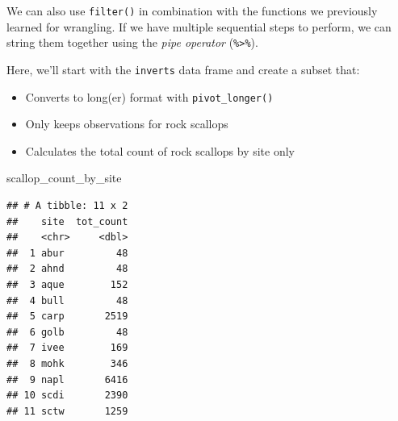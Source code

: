 \documentclass[]{book}
\newenvironment{Shaded}{\begin{snugshade}}{\end{snugshade}}
\newcommand{\CommentTok}[1]{\textcolor[rgb]{0.56,0.35,0.01}{\textit{#1}}}
\newcommand{\DataTypeTok}[1]{\textcolor[rgb]{0.13,0.29,0.53}{#1}}
\newcommand{\KeywordTok}[1]{\textcolor[rgb]{0.13,0.29,0.53}{\textbf{#1}}}
\newcommand{\NormalTok}[1]{#1}
\newcommand{\OperatorTok}[1]{\textcolor[rgb]{0.81,0.36,0.00}{\textbf{#1}}}
\newcommand{\OtherTok}[1]{\textcolor[rgb]{0.56,0.35,0.01}{#1}}
\newcommand{\StringTok}[1]{\textcolor[rgb]{0.31,0.60,0.02}{#1}}
\providecommand{\tightlist}{%
  \setlength{\itemsep}{0pt}\setlength{\parskip}{0pt}}
\begin{document}
We can also use \texttt{filter()} in combination with the functions we previously learned for wrangling. If we have multiple sequential steps to perform, we can string them together using the \emph{pipe operator} (\texttt{\%\textgreater{}\%}).

Here, we'll start with the \texttt{inverts} data frame and create a subset that:

\begin{itemize}
\tightlist
\item
  Converts to long(er) format with \texttt{pivot\_longer()}
\item
  Only keeps observations for rock scallops
\item
  Calculates the total count of rock scallops by site only
\end{itemize}

\begin{Shaded}
\end{Shaded}

\begin{Shaded}
\begin{Highlighting}[]
\NormalTok{scallop_count_by_site}
\end{Highlighting}
\end{Shaded}

\begin{verbatim}
## # A tibble: 11 x 2
##    site  tot_count
##    <chr>     <dbl>
##  1 abur         48
##  2 ahnd         48
##  3 aque        152
##  4 bull         48
##  5 carp       2519
##  6 golb         48
##  7 ivee        169
##  8 mohk        346
##  9 napl       6416
## 10 scdi       2390
## 11 sctw       1259
\end{verbatim}
\end{document}
